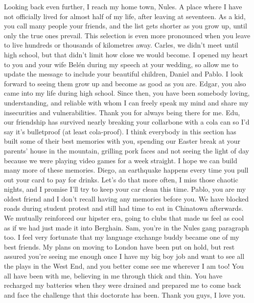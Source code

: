 Looking back even further, I reach my home town, Nules. A place where I have not officially lived for almost half of my life, after leaving at seventeen. As a kid, you call many people your friends, and the list gets shorter as you grow up, until only the true ones prevail. This selection is even more pronounced when you leave to live hundreds or thousands of kilometres away. Carles, we didn't meet until high school, but that didn't limit how close we would become. I opened my heart to you and your wife Belén during my speech at your wedding, so allow me to update the message to include your beautiful children, Daniel and Pablo. I look forward to seeing them grow up and become as good as you are. Edgar, you also came into my life during high school. Since then, you have been somebody loving, understanding, and reliable with whom I can freely speak my mind and share my insecurities and vulnerabilities. Thank you for always being there for me. Edu, our friendship has survived nearly breaking your collarbone with a cola can so I'd say it's bulletproof (at least cola-proof). I think everybody in this section has built some of their best memories with you, spending our Easter break at your parents' house in the mountain, grilling pork faces and not seeing the light of day because we were playing video games for a week straight. I hope we can build many more of these memories. Diego, an earthquake happens every time you pull out your card to pay for drinks. Let's do that more often, I miss those chaotic nights, and I promise I'll try to keep your car clean this time. Pablo, you are my oldest friend and I don't recall having any memories before you. We have blocked roads during student protest and still had time to eat in Chinatown afterwards. We mutually reinforced our hipster era, going to clubs that made us feel as cool as if we had just made it into Berghain. Sam, you're in the Nules gang paragraph too. I feel very fortunate that my language exchange buddy became one of my best friends. My plans on moving to London have been put on hold, but rest assured you're seeing me enough once I have my big boy job and want to see all the plays in the West End, and you better come see me wherever I am too! You all have been with me, believing in me through thick and thin. You have recharged my batteries when they were drained and prepared me to come back and face the challenge that this doctorate has been. Thank you guys, I love you. 

